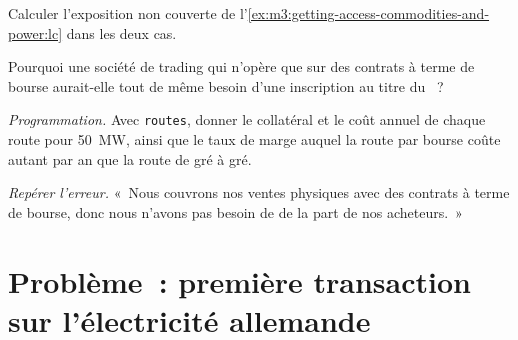 \begin{exercise}[$\star\star$]\label{exo:m3:getting-access-commodities-and-power:5}
Calculer l'exposition non couverte de l'\cref{ex:m3:getting-access-commodities-and-power:lc} dans les deux cas.
\end{exercise}

\begin{exercise}[$\star\star$]\label{exo:m3:getting-access-commodities-and-power:6}
Pourquoi une société de trading qui n'opère que sur des contrats à terme de bourse aurait-elle tout de même besoin d'une inscription au titre du ~?
\end{exercise}

\begin{exercise}[$\star\star\star$]\label{exo:m3:getting-access-commodities-and-power:7}
\emph{Programmation.} Avec \texttt{routes}, donner le collatéral et le coût annuel de chaque route pour 50~MW, ainsi que le taux de marge
auquel la route par bourse coûte autant par an que la route de gré à gré.
\end{exercise}

\begin{exercise}[$\star\star\star$]\label{exo:m3:getting-access-commodities-and-power:8}
\emph{Repérer l'erreur.} «~Nous couvrons nos ventes physiques avec des contrats à terme de bourse, donc nous n'avons pas besoin de 
de la part de nos acheteurs.~»
\end{exercise}

\section{Problème~: première transaction sur l'électricité allemande}

